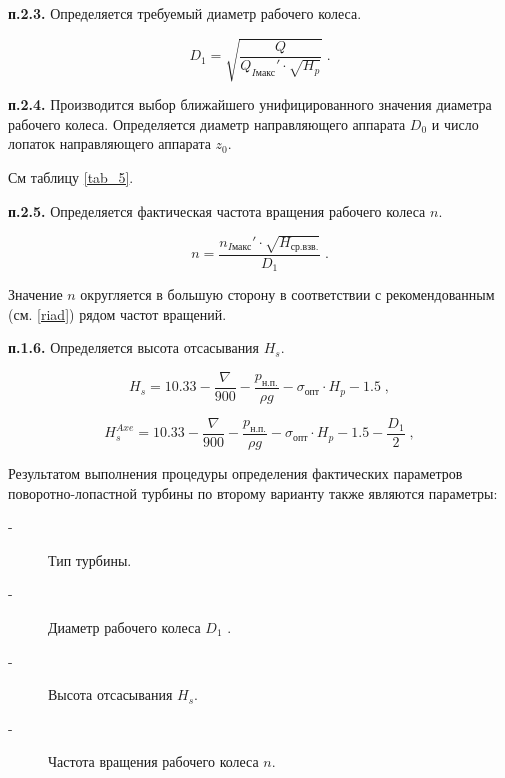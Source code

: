 \vspace{0.5cm}

\textbf{п.2.3.} Определяется требуемый диаметр рабочего колеса.

$$
   D_1 = \sqrt{ \frac{Q}{Q_{I\text{макс}}' \cdot \sqrt{H_p}} } \; .
$$

\vspace{0.5cm}


\textbf{п.2.4.} Производится выбор ближайшего унифицированного значения диаметра рабочего колеса. Определяется диаметр направляющего аппарата $D_0$ и число лопаток направляющего аппарата $z_0$.

См таблицу \ref{tab_5}.

\vspace{0.5cm}

\textbf{п.2.5.} Определяется фактическая частота вращения рабочего колеса $n$.

$$
   n = \frac{n_{I\text{макс}}' \cdot \sqrt{H_{\text{ср.взв.}}} }{D_1} \; .
$$

Значение $n$ округляется в большую сторону в соответствии с рекомендованным (см. \ref{riad}) рядом частот вращений.


\vspace{2cm}
\textbf{п.1.6.} Определяется высота отсасывания $H_s$.

$$
   H_s = 10.33 - \frac{\nabla}{900} - \frac{p_{\text{н.п.}}}{\rho g} - \sigma_{\text{опт}} \cdot H_p - 1.5  \; ,
$$

$$
   H_s^{Axe} = 10.33 - \frac{\nabla}{900} - \frac{p_{\text{н.п.}}}{\rho g} - \sigma_{\text{опт}} \cdot H_p - 1.5 - \frac{D_1}{2} \; ,
$$

\vspace{0.5cm}

Результатом выполнения процедуры определения фактических параметров поворотно-лопастной турбины по второму варианту также являются параметры:


\begin{description}
\item[-] Тип турбины. 
\item[-] Диаметр рабочего колеса $D_1$ .
\item[-] Высота отсасывания $H_s$.
\item[-] Частота вращения рабочего колеса $n$.
\end{description}





\vspace{1.5cm}

